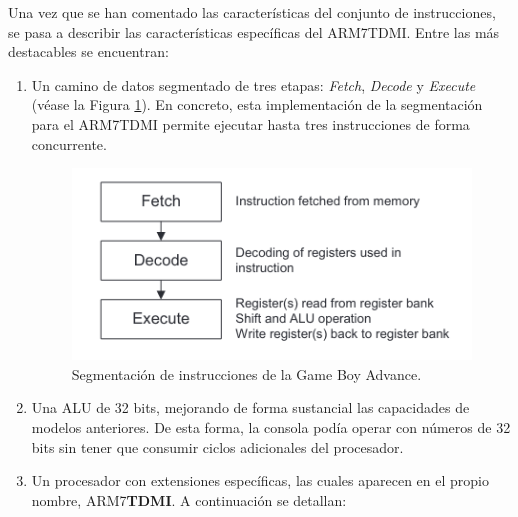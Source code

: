 Una vez que se han comentado las características del conjunto de instrucciones, se pasa a describir las características específicas del ARM7TDMI. Entre las más destacables se encuentran:

\begin{enumerate}
	\item Un camino de datos segmentado de tres etapas: \textit{Fetch}, \textit{Decode} y \textit{Execute} (véase la Figura \ref{fig:pipeline}). En concreto, esta implementación de la segmentación para el ARM7TDMI permite ejecutar hasta tres instrucciones de forma concurrente.

		\begin{figure}[h]
		    \centering
		    \includegraphics[width=.5\textwidth]{capitulos/capitulo2/pipeline.png}
		    \caption{Segmentación de instrucciones de la Game Boy Advance.}
		    \label{fig:pipeline}
		\end{figure}

	\item Una ALU de 32 bits, mejorando de forma sustancial las capacidades de modelos anteriores. De esta forma, la consola podía operar con números de 32 bits sin tener que consumir ciclos adicionales del procesador.
	\item Un procesador con extensiones específicas, las cuales aparecen en el propio nombre, ARM7\textbf{TDMI}. A continuación se detallan:


\end{enumerate}
